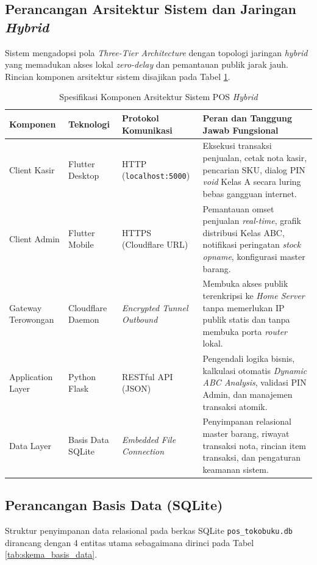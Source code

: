 \documentclass[11pt, a4paper]{article}
\begin{document}
\subsection{Perancangan Arsitektur Sistem dan Jaringan \textit{Hybrid}}
Sistem mengadopsi pola \textit{Three-Tier Architecture} dengan topologi jaringan \textit{hybrid} yang memadukan akses lokal \textit{zero-delay} dan pemantauan publik jarak jauh. Rincian komponen arsitektur sistem disajikan pada Tabel \ref{tab:arsitektur_sistem}.

\begin{table}[!htbp]
\centering
\caption{Spesifikasi Komponen Arsitektur Sistem POS \textit{Hybrid}}
\label{tab:arsitektur_sistem}
\small
\renewcommand{\arraystretch}{1.25}
\begin{tabularx}{\textwidth}{>{\raggedright\arraybackslash}p{2.2cm} >{\raggedright\arraybackslash}p{2.2cm} >{\raggedright\arraybackslash}p{2.8cm} >{\raggedright\arraybackslash}X}
\toprule
\textbf{Komponen} & \textbf{Teknologi} & \textbf{Protokol Komunikasi} & \textbf{Peran dan Tanggung Jawab Fungsional} \\
\midrule
Client Kasir & Flutter Desktop & HTTP (\texttt{localhost:5000}) & Eksekusi transaksi penjualan, cetak nota kasir, pencarian SKU, dialog PIN \textit{void} Kelas A secara luring bebas gangguan internet. \\ \addlinespace[0.3em]
Client Admin & Flutter Mobile & HTTPS (Cloudflare URL) & Pemantauan omset penjualan \textit{real-time}, grafik distribusi Kelas ABC, notifikasi peringatan \textit{stock opname}, konfigurasi master barang. \\ \addlinespace[0.3em]
Gateway Terowongan & Cloudflare Daemon & \textit{Encrypted Tunnel Outbound} & Membuka akses publik terenkripsi ke \textit{Home Server} tanpa memerlukan IP publik statis dan tanpa membuka porta \textit{router} lokal. \\ \addlinespace[0.3em]
Application Layer & Python Flask & RESTful API (JSON) & Pengendali logika bisnis, kalkulasi otomatis \textit{Dynamic ABC Analysis}, validasi PIN Admin, dan manajemen transaksi atomik. \\ \addlinespace[0.3em]
Data Layer & Basis Data SQLite & \textit{Embedded File Connection} & Penyimpanan relasional master barang, riwayat transaksi nota, rincian item transaksi, dan pengaturan keamanan sistem. \\
\bottomrule
\end{tabularx}
\end{table}

\subsection{Perancangan Basis Data (SQLite)}
Struktur penyimpanan data relasional pada berkas SQLite \texttt{pos\_tokobuku.db} dirancang dengan 4 entitas utama sebagaimana dirinci pada Tabel \ref{tab:skema_basis_data}.
\end{document}
